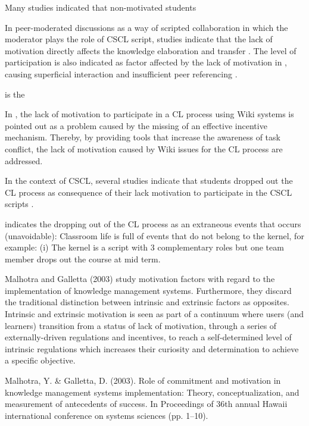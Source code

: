 Many studies indicated that non-motivated students 



In peer-moderated discussions as a way of scripted collaboration in which the moderator plays the role of CSCL script, studies indicate that the lack of motivation directly affects the knowledge elaboration and transfer \cite{XieKe2009}. The level of participation is also indicated as factor affected by the lack of motivation in \cite{MazzoliniMaddison2003}, causing superficial interaction \cite{WeinbergerErtlFischerMandl2005} and insufficient peer referencing \cite{Hewitt2005}.


\cite{AdamsWilsonWu1997} is the 




In \cite{WuVassilevaSunFang2014}, the lack of motivation to participate in a CL process using Wiki systems is pointed out as a problem caused by the missing of an effective incentive mechanism. Thereby, by providing tools that increase the awareness of task conflict, the lack of motivation caused by Wiki issues for the CL process are addressed.

In the context of CSCL, several studies indicate that students dropped out the CL process as consequence of their lack motivation to participate in the CSCL scripts \cite{Hamalainen2008, PapadopoulosDemetriadisStamelos2009}.

 indicates the dropping out of the CL process as an extraneous events that occurs (unavoidable): Classroom life is full of events that do not belong to the kernel, for example: (i) The kernel is a script with 3 complementary roles but one team member drops out the course at mid term.


Malhotra and Galletta (2003) study motivation factors with regard to the implementation of knowledge management systems. Furthermore, they discard the traditional distinction between intrinsic and extrinsic factors as opposites. Intrinsic and extrinsic motivation is seen as part of a continuum where users (and learners) transition from a status of lack of motivation, through a series of externally-driven regulations and incentives, to reach a self-determined level of intrinsic regulations which increases their curiosity and determination to achieve a specific objective.

Malhotra, Y. & Galletta, D. (2003). Role of commitment and motivation in knowledge management systems implementation: Theory, conceptualization, and measurement of antecedents of success. In Proceedings of 36th annual Hawaii international conference on systems sciences (pp. 1–10).

